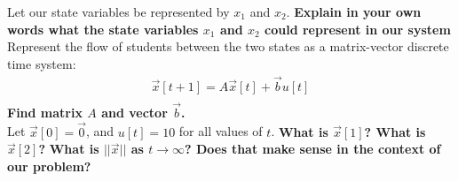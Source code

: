 \begin{enumerate}
    \qitem Let our state variables be represented by $x_1$ and $x_2$. \textbf{Explain in your own words what the state variables $x_1$ and $x_2$ could represent in our system}
    \ws{\vspace{2.5cm}}
    \qitem Represent the flow of students between the two states as a matrix-vector discrete time system:
    \begin{align*}
        \vec{x}[t+1] =  A\vec{x}[t] + \vec{b}u[t]\\
    \end{align*}
    \textbf{Find matrix $A$ and vector $\vec{b}$.} \\
    \ws{\vspace{8cm}}
    \qitem Let $\vec{x}[0] = \vec{0}$, and $u[t] = 10$ for all values of $t$. \textbf{What is $\vec{x}[1]$? What is $\vec{x}[2]$?} \textbf{What is $||\vec{x}||$ as $t\rightarrow\infty$? Does that make sense in the context of our problem?}


\end{enumerate}
